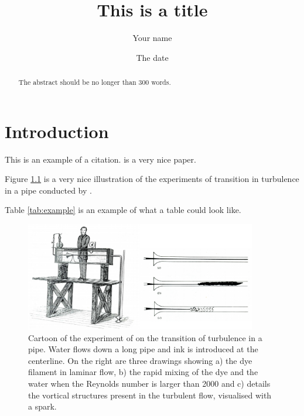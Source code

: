 \documentclass{icldt}
\title{This is a title}
\author{Your name}
\date{The date}
\begin{document}

\maketitle
\makedeclaration
\makecopyright
\makeacknowledgements

\begin{abstract}
The abstract should be no longer than 300 words.
\end{abstract}

\tableofcontents
\listoftables
\listoffigures


\chapter{Introduction}

This is an example of a citation. \citet{taylor1923stability} is a very nice paper.

Figure \ref{fig:reynolds_experiment} is a very nice illustration of the experiments of transition in turbulence in a pipe conducted by \citet{Reynolds1883}.

Table \ref{tab:example} is an example of what a table could look like.


\begin{figure}[]
\centering
\includegraphics[width=0.9\textwidth]{ReynoldsExperiment.eps}
\caption{Cartoon of the experiment of \citet{Reynolds1883} on the transition of turbulence in a pipe. Water flows down a long pipe and ink is introduced at the centerline. On the right are three drawings showing a) the dye filament in laminar flow, b) the rapid mixing of the dye and the water when the Reynolds number is larger than 2000 and c) details the vortical structures present in the turbulent flow, visualised with a spark.}
\label{fig:reynolds_experiment}
\end{figure}
\end{document}
